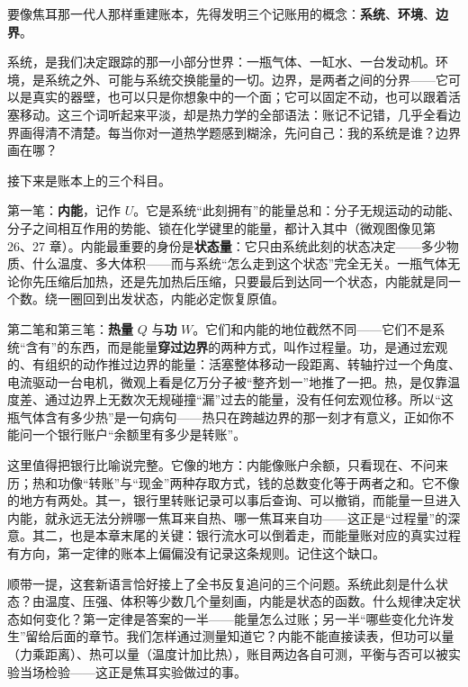 \begin{mainline}
要像焦耳那一代人那样重建账本，先得发明三个记账用的概念：\textbf{系统}、\textbf{环境}、\textbf{边界}。

系统，是我们决定跟踪的那一小部分世界：一瓶气体、一缸水、一台发动机。环境，是系统之外、可能与系统交换能量的一切。边界，是两者之间的分界——它可以是真实的器壁，也可以只是你想象中的一个面；它可以固定不动，也可以跟着活塞移动。这三个词听起来平淡，却是热力学的全部语法：账记不记错，几乎全看边界画得清不清楚。每当你对一道热学题感到糊涂，先问自己：我的系统是谁？边界画在哪？

接下来是账本上的三个科目。

第一笔：\textbf{内能}，记作 \(U\)。它是系统“此刻拥有”的能量总和：分子无规运动的动能、分子之间相互作用的势能、锁在化学键里的能量，都计入其中（微观图像见第 26、27 章）。内能最重要的身份是\textbf{状态量}：它只由系统此刻的状态决定——多少物质、什么温度、多大体积——而与系统“怎么走到这个状态”完全无关。一瓶气体无论你先压缩后加热，还是先加热后压缩，只要最后到达同一个状态，内能就是同一个数。绕一圈回到出发状态，内能必定恢复原值。

第二笔和第三笔：\textbf{热量} \(Q\) 与\textbf{功} \(W\)。它们和内能的地位截然不同——它们不是系统“含有”的东西，而是能量\textbf{穿过边界}的两种方式，叫作过程量。功，是通过宏观的、有组织的动作推过边界的能量：活塞整体移动一段距离、转轴拧过一个角度、电流驱动一台电机，微观上看是亿万分子被“整齐划一”地推了一把。热，是仅靠温度差、通过边界上无数次无规碰撞“漏”过去的能量，没有任何宏观位移。所以“这瓶气体含有多少热”是一句病句——热只在跨越边界的那一刻才有意义，正如你不能问一个银行账户“余额里有多少是转账”。

这里值得把银行比喻说完整。它像的地方：内能像账户余额，只看现在、不问来历；热和功像“转账”与“现金”两种存取方式，钱的总数变化等于两者之和。它不像的地方有两处。其一，银行里转账记录可以事后查询、可以撤销，而能量一旦进入内能，就永远无法分辨哪一焦耳来自热、哪一焦耳来自功——这正是“过程量”的深意。其二，也是本章末尾的关键：银行流水可以倒着走，而能量账对应的真实过程有方向，第一定律的账本上偏偏没有记录这条规则。记住这个缺口。

顺带一提，这套新语言恰好接上了全书反复追问的三个问题。系统此刻是什么状态？由温度、压强、体积等少数几个量刻画，内能是状态的函数。什么规律决定状态如何变化？第一定律是答案的一半——能量怎么过账；另一半“哪些变化允许发生”留给后面的章节。我们怎样通过测量知道它？内能不能直接读表，但功可以量（力乘距离）、热可以量（温度计加比热），账目两边各自可测，平衡与否可以被实验当场检验——这正是焦耳实验做过的事。
\end{mainline}

